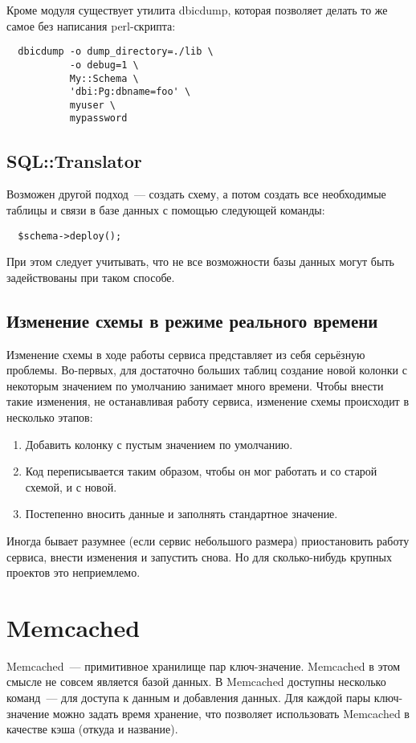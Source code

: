 Кроме модуля существует утилита dbicdump, которая позволяет делать то же самое без написания perl-скрипта:
\begin{verbatim}
  dbicdump -o dump_directory=./lib \
           -o debug=1 \
           My::Schema \
           'dbi:Pg:dbname=foo' \
           myuser \
           mypassword
\end{verbatim}

\subsection{SQL::Translator}
Возможен другой подход~--- создать схему, а потом создать все необходимые таблицы и связи в базе данных с помощью следующей команды:
\begin{verbatim}
  $schema->deploy();
\end{verbatim}
При этом следует учитывать, что не все возможности базы данных могут быть задействованы при таком способе. %

\subsection{Изменение схемы в режиме реального времени} %
Изменение схемы в ходе работы сервиса представляет из себя серьёзную проблемы. Во-первых, для достаточно больших таблиц создание новой колонки с некоторым значением по умолчанию занимает много времени. Чтобы внести такие изменения, не останавливая работу сервиса, изменение схемы происходит в несколько этапов:
\begin{enumerate}[nosep]
  \item Добавить колонку с пустым значением по умолчанию.
  \item Код переписывается таким образом, чтобы он мог работать и со старой схемой, и с новой.
  \item Постепенно вносить данные и заполнять стандартное значение.
\end{enumerate}
Иногда бывает разумнее (если сервис небольшого размера) приостановить работу сервиса, внести изменения и запустить снова. Но для сколько-нибудь крупных проектов это неприемлемо.

\section{Memcached}
Memcached~--- примитивное хранилище пар ключ-значение. Memcached в этом смысле не совсем является базой данных. В Memcached доступны несколько команд~--- для доступа к данным и добавления данных. Для каждой пары ключ-значение можно задать время хранение, что позволяет использовать Memcached в качестве кэша (откуда и название).

